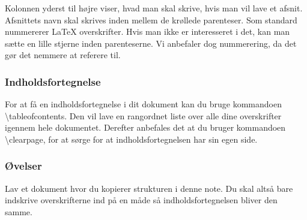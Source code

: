 \documentclass[titlepage]{article}
\begin{document}
Kolonnen yderst til højre viser, hvad man skal skrive, hvis man vil lave et afsnit.
Afsnittets navn skal skrives inden mellem de krøllede parenteser.
Som standard nummererer \LaTeX{} overskrifter. 
Hvis man ikke er interesseret i det, kan man sætte en lille stjerne inden parenteserne.
Vi anbefaler dog nummerering, da det gør det nemmere at referere til. 

\subsubsection{Indholdsfortegnelse}
For at få en indholdsfortegnelse i dit dokument kan du bruge kommandoen \textbackslash tableofcontents.
Den vil lave en rangordnet liste over alle dine overskrifter igennem hele dokumentet.
Derefter anbefales det at du bruger kommandoen \textbackslash clearpage, for at sørge for at indholdsfortegnelsen har sin egen side.

\subsubsection{Øvelser}
\begin{opg}
Lav et dokument hvor du kopierer strukturen i denne note. 
Du skal altså bare indskrive overskrifterne ind på en måde så indholdsfortegnelsen bliver den samme.
\end{opg}
\end{document}
